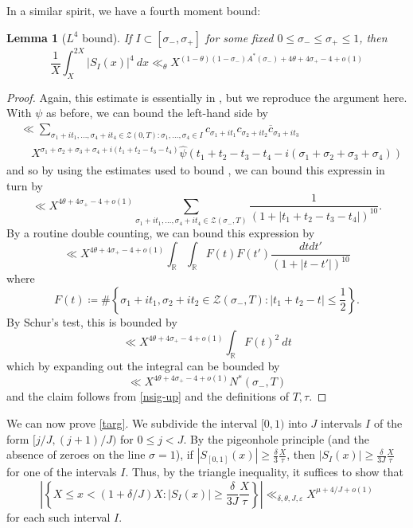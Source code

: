 \documentclass[12pt]{amsart}
\newtheorem{lemma}{Lemma}[section]
\newcommand{\eps}{\varepsilon}
\newcommand{\R}{\mathbb{R}}
\begin{document}
In a similar spirit, we have a fourth moment bound:

\begin{lemma}[$L^4$ bound]\label{l4-bound}  If $I \subset [\sigma_-, \sigma_+]$ for some fixed $0 \leq \sigma_- \leq \sigma_+ \leq 1$, then
$$ \frac{1}{X}\int_X^{2X} |S_I(x)|^4\ dx \ll_\theta X^{(1-\theta) (1-\sigma_-) A^*(\sigma_-) + 4\theta + 4\sigma_+ - 4 + o(1)}$$
\end{lemma}

\begin{proof}  Again, this estimate is essentially in \cite[\S 2]{HB-2}, but we reproduce the argument here.  With $\psi$ as before, we can bound the left-hand side by
\begin{align*}
&\ll \sum_{\sigma_1+it_1, \dots, \sigma_4+it_4 \in {\mathcal Z}(0,T): \sigma_1, \dots, \sigma_4 \in I} c_{\sigma_1+it_1} c_{\sigma_2+it_2} \overline{c}_{\sigma_3+it_3} \\
&\quad X^{\sigma_1+\sigma_2+\sigma_3+\sigma_4+i(t_1+t_2-t_3-t_4)} \hat \psi( t_1+t_2-t_3-t_4 - i(\sigma_1+\sigma_2+\sigma_3+\sigma_4))
\end{align*}
and so by using the estimates used to bound , we can bound this expressin in turn by
$$ \ll X^{4\theta+4\sigma_+-4+o(1)} \sum_{\sigma_1+it_1, \dots, \sigma_4+it_4 \in {\mathcal Z}(\sigma_-,T)}
\frac{1}{(1 + |t_1+t_2-t_3-t_4|)^{10}}.$$
By a routine double counting, we can bound this expression by
$$ \ll X^{4\theta+4\sigma_+-4+o(1)} \int_\R \int_\R F(t) F(t') \frac{dt dt'}{(1+|t-t'|)^{10}}$$
where
$$ F(t) \coloneqq \# \left\{ \sigma_1+it_1, \sigma_2+it_2 \in {\mathcal Z}(\sigma_-,T) : |t_1+t_2-t| \leq \frac{1}{2} \right\}.$$
By Schur's test, this is bounded by
$$ \ll X^{4\theta+4\sigma_+-4+o(1)} \int_\R F(t)^2\ dt$$
which by expanding out the integral can be bounded by
$$ \ll X^{4\theta+4\sigma_+-4+o(1)} N^*(\sigma_-, T)$$
and the claim follows from \eqref{nsig-up} and the definitions of $T,\tau$.
\end{proof}

We can now prove \eqref{targ}.  We subdivide the interval $[0,1)$ into $J$ intervals $I$ of the form $[j/J,(j+1)/J)$ for $0 \leq j < J$.  By the pigeonhole principle (and the absence of zeroes on the line $\sigma=1$), if $|S_{[0,1]}(x)| \geq \frac{\delta}{3} \frac{X}{\tau}$, then $|S_I(x)| \geq \frac{\delta}{3J} \frac{X}{\tau}$ for one of the intervals $I$.  Thus, by the triangle inequality, it suffices to show that
\begin{equation}\label{targ-2}
 \left|\left\{ X \leq x < (1+\delta/J) X: |S_I(x)| \geq \frac{\delta}{3J} \frac{X}{\tau} \right\}\right| \ll_{\delta,\theta,J,\eps} X^{\mu+4/J+o(1)}
\end{equation}
for each such interval $I$.
\end{document}
